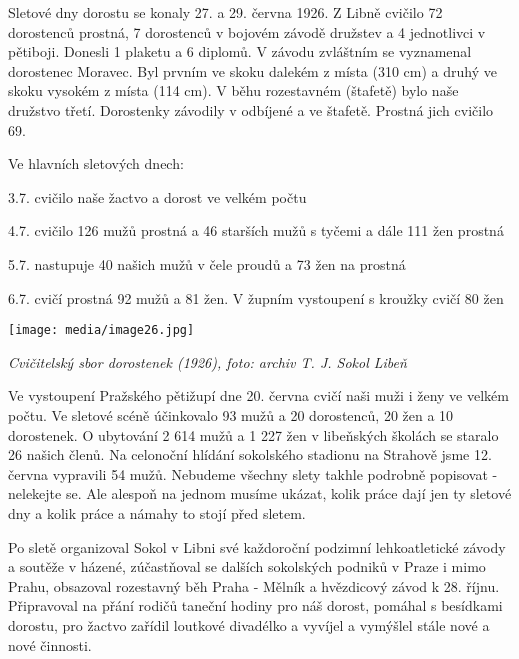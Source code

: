 Sletové dny dorostu se konaly 27. a 29. června 1926. Z Libně cvičilo 72
dorostenců prostná, 7 dorostenců v bojovém závodě družstev a 4
jednotlivci v pětiboji. Donesli 1 plaketu a 6 diplomů. V závodu
zvláštním se vyznamenal dorostenec Moravec. Byl prvním ve skoku dalekém
z místa (310 cm) a druhý ve skoku vysokém z místa (114 cm). V běhu
rozestavném (štafetě) bylo naše družstvo třetí. Dorostenky závodily v
odbíjené a ve štafetě. Prostná jich cvičilo 69.

Ve hlavních sletových dnech:

3.7. cvičilo naše žactvo a dorost ve velkém počtu

4.7. cvičilo 126 mužů prostná a 46 starších mužů s tyčemi a dále 111 žen
prostná

5.7. nastupuje 40 našich mužů v čele proudů a 73 žen na prostná

6.7. cvičí prostná 92 mužů a 81 žen. V župním vystoupení s kroužky cvičí
80 žen

\texttt{[image: media/image26.jpg]}

\emph{Cvičitelský sbor dorostenek (1926), foto: archiv T. J. Sokol
Libeň}

Ve vystoupení Pražského pětižupí dne 20. června cvičí naši muži i ženy
ve velkém počtu. Ve sletové scéně účinkovalo 93 mužů a 20 dorostenců, 20
žen a 10 dorostenek. O ubytování 2 614 mužů a 1 227 žen v libeňských
školách se staralo 26 našich členů. Na celonoční hlídání sokolského
stadionu na Strahově jsme 12. června vypravili 54 mužů. Nebudeme všechny
slety takhle podrobně popisovat - nelekejte se. Ale alespoň na jednom
musíme ukázat, kolik práce dají jen ty sletové dny a kolik práce a
námahy to stojí před sletem.

Po sletě organizoval Sokol v Libni své každoroční podzimní
lehkoatletické závody a soutěže v házené, zúčastňoval se dalších
sokolských podniků v Praze i mimo Prahu, obsazoval rozestavný běh Praha
- Mělník a hvězdicový závod k 28. říjnu. Připravoval na přání rodičů
taneční hodiny pro náš dorost, pomáhal s besídkami dorostu, pro žactvo
zařídil loutkové divadélko a vyvíjel a vymýšlel stále nové a nové
činnosti.

